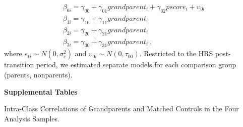 \documentclass[
  english,
  man, noextraspace]{apa7}
\begin{document}
\begin{appendix}
\begin{equation}
\begin{split}
& \beta_{0i} = \gamma_{00} + \gamma_{01}grandparent_i + \gamma_{02}pscore_i + \upsilon_{0i} \\
& \beta_{1i} = \gamma_{10} + \gamma_{11}grandparent_i \\
& \beta_{2i} = \gamma_{20} + \gamma_{21}grandparent_i \\
& \beta_{3i} = \gamma_{30} + \gamma_{31}grandparent_i\ ,
\end{split}
\label{eq:mlm4}
\end{equation} where \(e_{ti} \sim N(0, \sigma_e^2)\) and
\(\upsilon_{0i} \sim N(0, \tau_{00})\). Restricted to the HRS
post-transition period, we estimated separate models for each comparison
group (parents, nonparents).

\newpage

\noindent \textbf{Supplemental Tables}

\begin{table}[h]

\begin{center}
\begin{threeparttable}

\caption{\label{tab:icc-table}Intra-Class Correlations of Grandparents and Matched Controls in the Four Analysis Samples.}


\end{threeparttable}
\end{center}
\end{table}
\end{appendix}
\end{document}
